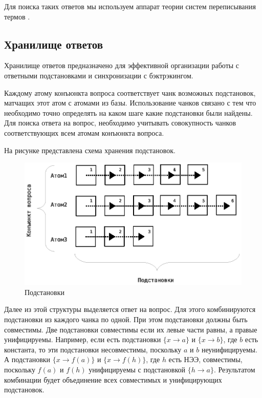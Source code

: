 Для поиска таких ответов мы используем аппарат теории систем переписывания термов \cite{Nipkow}.



\subsection{Хранилище ответов}
Хранилище ответов предназначено для эффективной организации работы с ответными подстановками и синхронизации с бэктрэкингом.

Каждому атому конъюнкта вопроса соответствует чанк возможных подстановок, матчащих этот атом с атомами из базы. Использование чанков связано с тем что необходимо точно определять на каком шаге какие подстановки были найдены. Для поиска ответа на вопрос, необходимо учитывать совокупность чанков соответствующих всем атомам конъюнкта вопроса.

На рисунке представлена схема хранения подстановок.

\begin{figure}[h]
	\centering
	\includegraphics[width=0.6\linewidth]{pics/AnBase.eps}
	\caption{Подстановки}
	\label{fig:anbase}
\end{figure}

Далее из этой структуры выделяется ответ на вопрос. Для этого комбинируются подстановки из каждого чанка по одной. При этом подстановки должны быть совместимы. Две подстановки совместимы если их левые части равны, а правые унифицируемы. Например, если есть подстановки $\{x \rightarrow a\}$ и $\{x \rightarrow b\}$, где $b$ есть константа, то эти подстановки несовместимы, поскольку $a$ и $b$ неунифицируемы. А подстановки $\{x \rightarrow f(a)\}$ и $\{x \rightarrow f(h)\}$, где $h$ есть НЭЭ, совместимы, поскольку $f(a)$ и $f(h)$ унифицируемы с подстановкой $\{h \rightarrow a\}$. Результатом комбинации будет объединение всех совместимых и унифицирующих подстановок.

